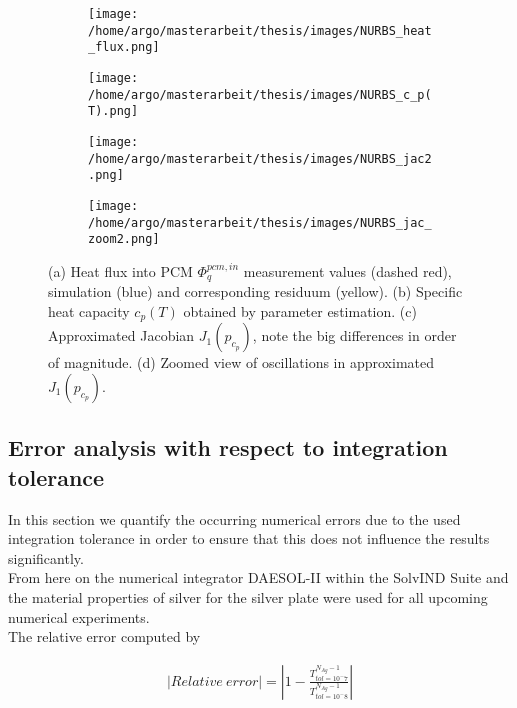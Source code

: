 \documentclass{scrartcl}[12pt, halfparskip]
\numberwithin{equation}{section}
\numberwithin{figure}{section}
\numberwithin{table}{section}
\begin{document}
\begin{figure}[H]
	\begin{subfigure}{0.49\textwidth}
		\texttt{[image: /home/argo/masterarbeit/thesis/images/NURBS\_heat\_flux.png]}
		\caption{}
	\end{subfigure}
	\begin{subfigure}{0.49\textwidth}
		\texttt{[image: /home/argo/masterarbeit/thesis/images/NURBS\_c\_p(T).png]}
		\caption{}
	\end{subfigure}
	\begin{subfigure}{0.49\textwidth}
		\hspace{0.1cm}
		\texttt{[image: /home/argo/masterarbeit/thesis/images/NURBS\_jac2.png]}
		\caption{}
	\end{subfigure}
	\begin{subfigure}{0.49\textwidth}
		\hspace{0.4cm}
		\texttt{[image: /home/argo/masterarbeit/thesis/images/NURBS\_jac\_zoom2.png]}
		\caption{}
	\end{subfigure}
	\caption{(a) Heat flux into PCM $\varPhi_q^{pcm,in}$ measurement values (dashed red), simulation (blue) and corresponding residuum (yellow). (b) Specific heat capacity $c_p(T)$ obtained by parameter estimation. (c) Approximated Jacobian $J_1(p_{c_p})$, note the big differences in order of magnitude. (d) Zoomed view of oscillations in approximated $J_1(p_{c_p})$.}
	\label{fig:NURBS_results}
\end{figure}




\subsection{Error analysis with respect to integration tolerance}
In this section we quantify the occurring numerical errors due to the used integration tolerance in order to ensure that this does not influence the results significantly. \\
From here on the numerical integrator DAESOL-II within the SolvIND Suite and the material properties of silver for the silver plate were used for all upcoming numerical experiments. \\
The relative error computed by

\begin{align}
	|Relative \ error| = \left|1 - \frac{T^{N_{Ag}-1}_{tol=10^-7}}{T^{N_{Ag}-1}_{tol=10^-8}} \right|
	\label{eq:relErr_integration_tolerance}
\end{align}
\end{document}
